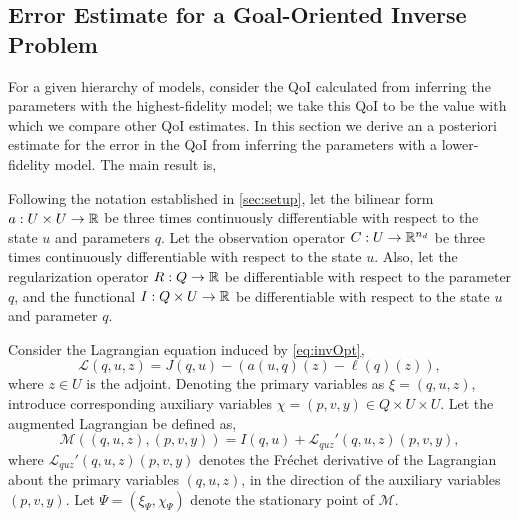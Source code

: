\subsection[Error Estimate for a Goal-Oriented Inverse Problem]{Error Estimate for a Goal-Oriented Inverse Problem}  \label{sec:deriv}
%
For a given hierarchy of models, consider the QoI calculated from inferring the parameters with the highest-fidelity model; we take this QoI to be the value with which we compare other QoI estimates. In this section we derive an a posteriori estimate for the error in the QoI from inferring the parameters with a lower-fidelity model. The main result is,
%
\begin{theorem}
\label{thm:error_estimate}
Following the notation established in \cref{sec:setup}, let the bilinear form $a:U \times U \to {\mathbb{R}}$ be three times continuously differentiable with respect to the state $u$ and parameters $q$. Let the observation operator $C:U\to{\mathbb{R}}^{n_d}$ be three times continuously differentiable with respect to the state $u$. Also, let the regularization operator $R:Q\to{\mathbb{R}}$ be differentiable with respect to the parameter $q$, and the functional $I:Q\times U\to{\mathbb{R}}$ be differentiable with respect to the state $u$ and parameter $q$.

Consider the Lagrangian equation induced by \cref{eq:invOpt},
%
\begin{equation}
\label{eq:InvsOpt_lag}
\mathcal{L}(q,u,z)= J(q,u)-(a(u,q)(z)-\ell(q)(z)),
\end{equation}
%
where $z\in U$ is the adjoint. Denoting the primary variables as $\xi=(q,u,z)$, introduce corresponding auxiliary variables $\chi=(p,v,y)\in Q\times U\times U$. Let the augmented Lagrangian be defined as,
%
\begin{equation}
\label{eq:InvsOpt_auglag}
\mathcal{M}((q,u,z),(p,v,y)) = I(q,u) + \mathcal{L}_{quz}'(q,u,z)(p,v,y),
\end{equation}
%
where $\mathcal{L}_{quz}'(q,u,z)(p,v,y)$ denotes the Fr\'{e}chet derivative of the Lagrangian about the primary variables $(q,u,z)$, in the direction of the auxiliary variables $(p,v,y)$. Let $\Psi = (\xi_\Psi,\chi_\Psi)$ denote the stationary point of $\mathcal{M}$.


\end{theorem}

